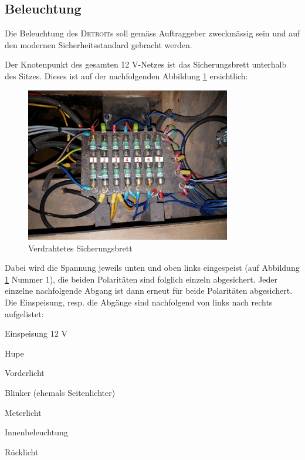 \subsection{Beleuchtung}

Die Beleuchtung des \textsc{Detroit}s soll gemäss Auftraggeber zweckmässig sein und auf den modernen Sicherheitsstandard gebracht werden.

\color{blue}
Der Knotenpunkt des gesamten 12 V-Netzes ist das Sicherungsbrett unterhalb des Sitzes. Dieses ist auf der nachfolgenden Abbildung \ref{fig:Sicherungsbrett} ersichtlich:

\begin{figure}[h!]
	\centering
		\includegraphics[width=0.8\textwidth]{images/Sicherungsbrett}
	\caption{Verdrahtetes Sicherungsbrett}
	\label{fig:Sicherungsbrett}
\end{figure}

Dabei wird die Spannung jeweils unten und oben links eingespeist (auf Abbildung \ref{fig:Sicherungsbrett} Nummer 1), die beiden Polaritäten sind folglich einzeln abgesichert. Jeder einzelne nachfolgende Abgang ist dann erneut für beide Polaritäten abgesichert. Die Einspeisung, resp. die Abgänge sind nachfolgend von links nach rechts aufgelistet:

\begin{compactenum}
\item Einspeisung $12$ V
\item Hupe
\item Vorderlicht
\item Blinker (ehemals Seitenlichter)
\item Meterlicht
\item Innenbeleuchtung
\item Rücklicht
\end{compactenum}

